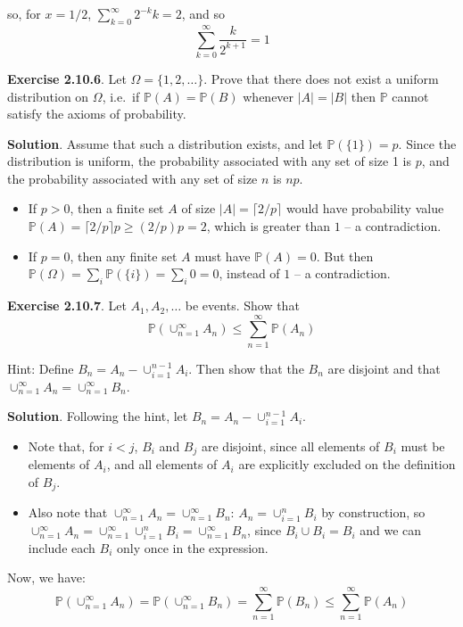 so, for \(x = 1/2\), \(\sum_{k = 0}^{\infty} 2^{-k} k = 2\), and so
\[
\sum_{k = 0}^{\infty} \frac{k}{2^{k + 1}} = 1 
\]

\textbf{Exercise 2.10.6}. Let \(\Omega = \{1, 2, \dots\}\). Prove that there does not exist a uniform distribution on \(\Omega\), i.e.~if \(\mathbb{P}(A)  =\mathbb{P}(B)\) whenever \(|A| = |B|\) then \(\mathbb{P}\) cannot satisfy the axioms of probability.

\textbf{Solution}. Assume that such a distribution exists, and let \(\mathbb{P}(\{1\}) = p\). Since the distribution is uniform, the probability associated with any set of size 1 is \(p\), and the probability associated with any set of size \(n\) is \(np\).

\begin{itemize}
\item
  If \(p > 0\), then a finite set \(A\) of size
  \(|A| = \lceil 2 / p \rceil\) would have probability value
  \(\mathbb{P}(A) = \lceil 2 / p \rceil p \geq (2 / p) p = 2\), which is
  greater than \(1\) -- a contradiction.
\item
  If \(p = 0\), then any finite set \(A\) must have
  \(\mathbb{P}(A) = 0\). But then
  \(\mathbb{P}(\Omega) = \sum_{i} \mathbb{P}(\{ i \}) = \sum_{i} 0 = 0\),
  instead of \(1\) -- a contradiction.
\end{itemize}

\textbf{Exercise 2.10.7}. Let \(A_{1}, A_{2}, \dots\) be events. Show that
\[
\mathbb{P}\left( \cup_{n=1}^{\infty} A_{n} \right) \leq \sum_{n=1}^{\infty} \mathbb{P}(A_{n}) 
\]

Hint: Define \(B_{n} = A_{n} - \cup_{i=1}^{n-1} A_{i}\). Then show that the
\(B_{n}\) are disjoint and that
\(\cup_{n=1}^{\infty} A_{n}  =\cup_{n=1}^{\infty} B_{n}\).

\textbf{Solution}. Following the hint, let
\(B_{n} = A_{n} - \cup_{i=1}^{n-1} A_{i}\).

\begin{itemize}[tightlist]
\item
  Note that, for \(i < j\), \(B_{i}\) and \(B_{j}\) are disjoint, since all
  elements of \(B_{i}\) must be elements of \(A_{i}\), and all elements of
  \(A_{i}\) are explicitly excluded on the definition of \(B_{j}\).
\item
  Also note that \(\cup_{n=1}^{\infty} A_{n} = \cup_{n=1}^{\infty} B_{n}\):
  \(A_{n} = \cup_{i=1}^{n} B_{i}\) by construction, so
  \(\cup_{n=1}^{\infty} A_{n} = \cup_{n=1}^{\infty} \cup_{i=1}^{n} B_{i} = \cup_{n=1}^{\infty} B_{n}\),
  since \(B_{i} \cup B_{i} = B_{i}\) and we can include each \(B_{i}\) only once
  in the expression.
\end{itemize}
Now, we have:
\[
\mathbb{P}\left( \cup_{n=1}^{\infty} A_{n} \right) = \mathbb{P}\left( \cup_{n=1}^{\infty} B_{n} \right) = \sum_{n=1}^{\infty} \mathbb{P}(B_{n}) \leq \sum_{n=1}^{\infty} \mathbb{P}(A_{n}) 
\]

